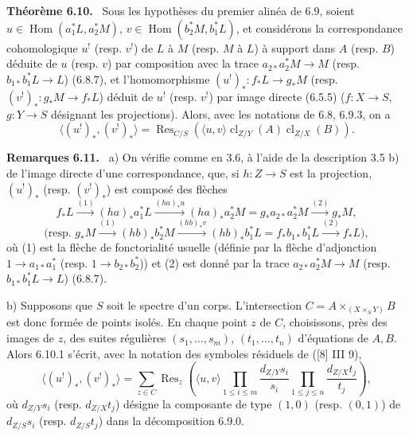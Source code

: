 \documentclass[11pt]{article}
\newenvironment{statement}[1]{\par\medskip\noindent\textbf{#1.}\ }{\par\medskip}
\DeclareMathOperator{\Hom}{Hom}
\providecommand{\cl}{\operatorname{cl}}
\providecommand{\Hom}{\operatorname{Hom}}
\begin{document}
\begin{statement}{Théorème 6.10}
Sous les hypothèses du premier alinéa de 6.9, soient $u\in\Hom(a_1^*L,a_2^*M)$, $v\in\Hom(b_2^*M,b_1^*L)$, et considérons la correspondance cohomologique $u^!$ (resp. $v^!$) de $L$ à $M$ (resp. $M$ à $L$) à support dans $A$ (resp. $B$) déduite de $u$ (resp. $v$) par composition avec la trace $a_{2*}a_2^*M\to M$ (resp. $b_{1*}b_1^*L\to L$) (6.8.7), et l'homomorphisme $(u^!)_*:f_*L\to g_*M$ (resp. $(v^!)_*:g_*M\to f_*L$) déduit de $u^!$ (resp. $v^!$) par image directe (6.5.5) ($f:X\to S$, $g:Y\to S$ désignant les projections). Alors, avec les notations de 6.8, 6.9.3, on a
\begin{equation}
\tag{6.10.1}
\langle (u^!)_*,(v^!)_*\rangle=\operatorname{Res}_{C/S}(\langle u,v\rangle\cl_{Z/Y}(A)\cl_{Z/X}(B)).
\end{equation}
\end{statement}

\begin{statement}{Remarques 6.11}
a) On vérifie comme en 3.6, à l'aide de la description 3.5 b) de l'image directe d'une correspondance, que, si $h:Z\to S$ est la projection, $(u^!)_*$ (resp. $(v^!)_*$) est composé des flèches
\[
f_*L\xrightarrow{(1)}(ha)_*a_1^*L\xrightarrow{(ha)_*u}(ha)_*a_2^*M=g_*a_{2*}a_2^*M\xrightarrow{(2)}g_*M,
\]
\[
\text{(resp. }g_*M\xrightarrow{(1)}(hb)_*b_2^*M\xrightarrow{(hb)_*v}(hb)_*b_1^*L=f_*b_{1*}b_1^*L\xrightarrow{(2)}f_*L\text{)},
\]
où (1) est la flèche de fonctorialité usuelle (définie par la flèche d'adjonction $1\to a_{1*}a_1^*$ (resp. $1\to b_{2*}b_2^*$)) et (2) est donné par la trace $a_{2*}a_2^*M\to M$ (resp. $b_{1*}b_1^*L\to L$) (6.8.7).

b) Supposons que $S$ soit le spectre d'un corps. L'intersection $C=A\times_{(X\times_S Y)}B$ est donc formée de points isolés. En chaque point $z$ de $C$, choisissons, près des images de $z$, des suites régulières $(s_1,\ldots,s_m)$, $(t_1,\ldots,t_n)$ d'équations de $A,B$. Alors 6.10.1 s'écrit, avec la notation des symboles résiduels de ([8] III 9),
\begin{equation}
\tag{6.11.1}
\langle (u^!)_*,(v^!)_*\rangle=
\sum_{z\in C}\operatorname{Res}_z\left(\langle u,v\rangle
\prod_{1\le i\le m}\frac{d_{Z/Y}s_i}{s_i}
\prod_{1\le j\le n}\frac{d_{Z/X}t_j}{t_j}\right),
\end{equation}
où $d_{Z/Y}s_i$ (resp. $d_{Z/X}t_j$) désigne la composante de type $(1,0)$ (resp. $(0,1)$) de $d_{Z/S}s_i$ (resp. $d_{Z/S}t_j$) dans la décomposition 6.9.0.
\end{statement}
\end{document}
